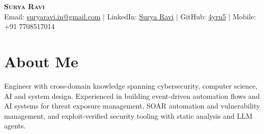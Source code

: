 \documentclass[a4paper,10pt]{article}
\newcommand{\link}[2]{\href{#1}{\color{blue}#2}}
\begin{document}
\begin{center}
  \textbf{\huge \scshape Surya Ravi} \\ \vspace{6pt}
  \small Email: \link{mailto:suryaravi.in@gmail.com}{suryaravi.in@gmail.com} $|$
  LinkedIn: \link{https://www.linkedin.com/in/4yru5/}{Surya Ravi} $|$
  GitHub: \link{https://github.com/4yru5}{4yru5} $|$
  Mobile: +91 7708517014
\end{center}

\section{About Me}
\small{Engineer with cross-domain knowledge spanning cybersecurity, computer
science, AI and system design. Experienced in building event-driven automation
flows and AI systems for threat exposure management, SOAR automation and
vulnerability management, and exploit-verified
security tooling with static analysis and LLM agents.}
\end{document}
